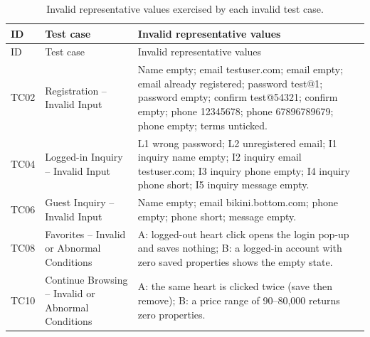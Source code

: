 {\footnotesize
\setlength{\tabcolsep}{4pt}
\begin{longtable}{@{}p{1.2cm} p{3.8cm} p{10.0cm}@{}}
  \caption{Invalid representative values exercised by each invalid test case.\label{tab:invalid-inputs}}\\
  \toprule
  ID & Test case & Invalid representative values \\
  \midrule
  \endfirsthead
  \toprule
  ID & Test case & Invalid representative values \\
  \midrule
  \endhead
  \bottomrule
  \endlastfoot
  TC02 & Registration -- Invalid Input & Name empty; email testuser.com; email empty; email already registered; password test@1; password empty; confirm test@54321; confirm empty; phone 12345678; phone 67896789679; phone empty; terms unticked. \\
  TC04 & Logged-in Inquiry -- Invalid Input & L1 wrong password; L2 unregistered email; I1 inquiry name empty; I2 inquiry email testuser.com; I3 inquiry phone empty; I4 inquiry phone short; I5 inquiry message empty. \\
  TC06 & Guest Inquiry -- Invalid Input & Name empty; email bikini.bottom.com; phone empty; phone short; message empty. \\
  TC08 & Favorites -- Invalid or Abnormal Conditions & A: logged-out heart click opens the login pop-up and saves nothing; B: a logged-in account with zero saved properties shows the empty state. \\
  TC10 & Continue Browsing -- Invalid or Abnormal Conditions & A: the same heart is clicked twice (save then remove); B: a price range of 90--80,000 returns zero properties. \\
\end{longtable}
}
